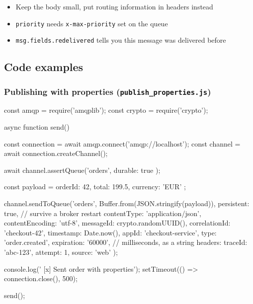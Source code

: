 \documentclass[11pt,a4paper]{article}
\begin{document}
\begin{itemize}\itemsep2pt
  \item Keep the body small, put routing information in headers instead
  \item \lstinline|priority| needs \lstinline|x-max-priority| set on the queue
  \item \lstinline|msg.fields.redelivered| tells you this message was delivered before
\end{itemize}

\newpage
\subsection{Code examples}

\subsubsection*{Publishing with properties (\texttt{publish\_properties.js})}
\begin{js}[basicstyle=\ttfamily\scriptsize]
const amqp = require('amqplib');
const crypto = require('crypto');

async function send() {
    const connection = await amqp.connect('amqp://localhost');
    const channel = await connection.createChannel();

    await channel.assertQueue('orders', { durable: true });

    const payload = { orderId: 42, total: 199.5, currency: 'EUR' };

    channel.sendToQueue('orders', Buffer.from(JSON.stringify(payload)), {
        persistent: true,                    // survive a broker restart
        contentType: 'application/json',
        contentEncoding: 'utf-8',
        messageId: crypto.randomUUID(),
        correlationId: 'checkout-42',
        timestamp: Date.now(),
        appId: 'checkout-service',
        type: 'order.created',
        expiration: '60000',                 // milliseconds, as a string
        headers: {
            traceId: 'abc-123',
            attempt: 1,
            source: 'web'
        }
    });

    console.log(' [x] Sent order with properties');
    setTimeout(() => connection.close(), 500);
}
send();
\end{js}
\end{document}
